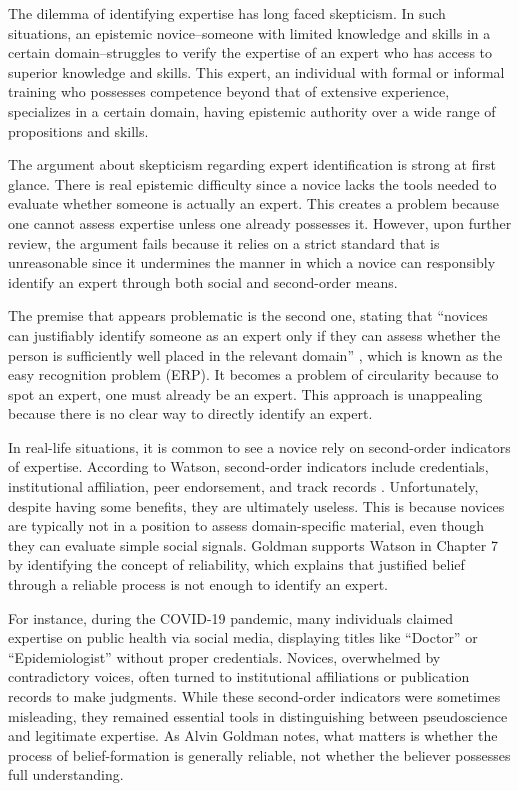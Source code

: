 
The dilemma of identifying expertise has long faced skepticism. In such situations, an epistemic novice–someone with limited knowledge and skills in a certain domain–struggles to verify the expertise of an expert who has access to superior knowledge and skills. This expert, an individual with formal or informal training who possesses competence beyond that of extensive experience, specializes in a certain domain, having epistemic authority over a wide range of propositions and skills.

The argument about skepticism regarding expert identification is strong at first glance. There is real epistemic difficulty since a novice lacks the tools needed to evaluate whether someone is actually an expert. This creates a problem because one cannot assess expertise unless one already possesses it. However, upon further review, the argument fails because it relies on a strict standard that is unreasonable since it undermines the manner in which a novice can responsibly identify an expert through both social and second-order means.

The premise that appears problematic is the second one, stating that “novices can justifiably identify someone as an expert only if they can assess whether the person is sufficiently well placed in the relevant domain” \autocite[p.\ 178]{watson2022fixing}, which is known as the easy recognition problem (ERP). It becomes a problem of circularity because to spot an expert, one must already be an expert. This approach is unappealing because there is no clear way to directly identify an expert.

In real-life situations, it is common to see a novice rely on second-order indicators of expertise. According to Watson, second-order indicators include credentials, institutional affiliation, peer endorsement, and track records \autocite[p.\ 179]{watson2022fixing}. Unfortunately, despite having some benefits, they are ultimately useless. This is because novices are typically not in a position to assess domain-specific material, even though they can evaluate simple social signals. Goldman supports Watson in Chapter 7 by identifying the concept of reliability, which explains that justified belief through a reliable process is not enough to identify an expert.

For instance, during the COVID-19 pandemic, many individuals claimed expertise on public health via social media, displaying titles like “Doctor” or “Epidemiologist” without proper credentials. Novices, overwhelmed by contradictory voices, often turned to institutional affiliations or publication records to make judgments. While these second-order indicators were sometimes misleading, they remained essential tools in distinguishing between pseudoscience and legitimate expertise. As Alvin Goldman notes, what matters is whether the process of belief-formation is generally reliable, not whether the believer possesses full understanding.


